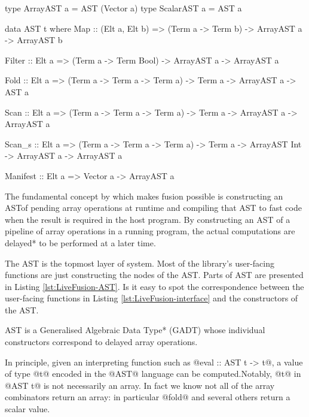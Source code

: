\documentclass[preamble.tex]{subfiles}
\begin{document}
\begin{hscode2}[%
    caption={\LiveFusion AST (partial).},%
    label=lst:LiveFusion-AST,%
]
type ArrayAST a = AST (Vector a)
type ScalarAST a = AST a

data AST t where
  Map      :: (Elt a, Elt b)
           => (Term a -> Term b)
           -> ArrayAST a
           -> ArrayAST b

  Filter   :: Elt a
           => (Term a -> Term Bool)
           -> ArrayAST a
           -> ArrayAST a

  Fold     :: Elt a
           => (Term a -> Term a -> Term a)
           -> Term a
           -> ArrayAST a
           -> AST a

  Scan     :: Elt a
           => (Term a -> Term a -> Term a)
           -> Term a
           -> ArrayAST a
           -> ArrayAST a

  Scan_s   :: Elt a
           => (Term a -> Term a -> Term a)
           -> Term a
           -> ArrayAST Int
           -> ArrayAST a
           -> ArrayAST a

  Manifest :: Elt a
           => Vector a
           -> ArrayAST a
\end{hscode2}

The fundamental concept by which \LiveFusion makes fusion possible is constructing an AST\iast of pending array operations at runtime and compiling that AST to fast code when the result is required in the host program. By constructing an AST of a pipeline of array operations in a running program, the actual computations are \*delayed* to be performed at a later time.

The AST is the topmost layer of \LiveFusion system. Most of the library's user-facing functions are just constructing the nodes of the AST. Parts of \LiveFusion AST are presented in Listing \ref{lst:LiveFusion-AST}. Is it easy to spot the correspondence between the user-facing functions in Listing \ref{lst:LiveFusion-interface} and the constructors of the AST.

\LiveFusion AST is a \*Generalised Algebraic Data Type* (GADT) \cite{Jones:2006eh} whose individual constructors correspond to delayed array operations.

In principle, given an interpreting function such as @eval :: AST t -> t@, a value of type @t@ encoded in the @AST@ language can be computed.Notably, @t@ in @AST t@ is not necessarily an array. In fact we know not all of the array combinators return an array: in particular @fold@ and several others return a scalar value.
\end{document}
